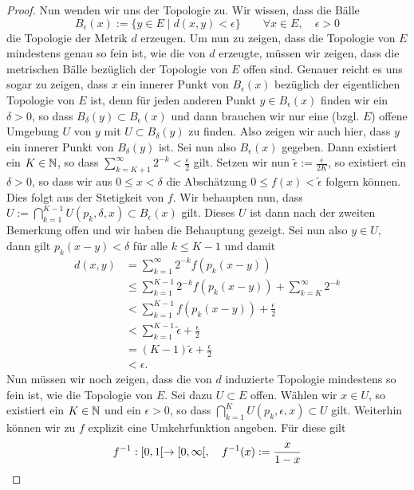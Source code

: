 \begin{proof}
  Nun wenden wir uns der Topologie zu. Wir wissen, dass die Bälle
  \[
  B_\epsilon(x) := \{ y \in E \mid d(x,y) < \epsilon \} \qquad \forall
  x \in E, \quad \epsilon > 0
  \]
  die Topologie der Metrik $d$ erzeugen. Um nun zu zeigen, dass die
  Topologie von $E$ mindestens genau so fein ist, wie die von $d$
  erzeugte, müssen wir zeigen, dass die metrischen Bälle bezüglich der
  Topologie von $E$ offen sind. Genauer reicht es uns sogar
  zu zeigen, dass $x$ ein innerer Punkt von $B_\epsilon(x)$ bezüglich
  der eigentlichen Topologie von $E$ ist, denn
  für jeden anderen Punkt $y \in B_\epsilon(x)$ finden wir ein
  $\delta >0$, so dass $B_\delta(y) \subset B_\epsilon(x)$ und dann
  brauchen wir nur eine (bzgl. $E$) offene Umgebung $U$ von $y$ mit $U
  \subset B_\delta(y)$ zu finden. Also zeigen wir auch hier, dass $y$
  ein innerer Punkt von $B_\delta(y)$ ist. Sei nun also
  $B_\epsilon(x)$ gegeben. Dann existiert ein $K \in \mathbb{N}$, so dass
  $\sum_{k=K+1}^\infty 2^{-k} < \frac{\epsilon}{2}$ gilt. Setzen wir
  nun $\tilde \epsilon := \frac{\epsilon}{2K}$, so  existiert ein
  $\delta > 0$, so dass wir aus $0 \leq x < \delta$ die Abschätzung $0
  \leq f(x) < \tilde \epsilon$ folgern können. Dies folgt aus der
  Stetigkeit von $f$. Wir behaupten nun, dass
  $U := \bigcap_{k=1}^{K-1} U(p_k, \delta, x) \subset B_\epsilon(x)$
  gilt. Dieses $U$ ist dann nach der zweiten Bemerkung offen und wir
  haben die Behauptung gezeigt. Sei nun also $y \in U$, dann gilt
  $p_k(x-y) < \delta$ für alle $k \leq K-1$ und damit
  \begin{align*}
    d(x,y) & = \sum_{k=1}^\infty 2^{-k} f(p_k(x-y)) \\
    & \leq \sum_{k=1}^{K-1}2^{-k} f(p_k(x-y)) + \sum_{k=K}^\infty 2^{-k} \\
    & < \sum_{k=1}^{K-1} f(p_k(x-y)) + \frac{\epsilon}{2} \\
    & < \sum_{k=1}^{K-1} \tilde \epsilon + \frac{\epsilon}{2} \\
    & = (K-1) \tilde \epsilon + \frac{\epsilon}{2}\\
    & < \epsilon.
  \end{align*}
  Nun müssen wir noch zeigen, dass die von $d$ induzierte Topologie
  mindestens so fein ist, wie die Topologie von $E$. Sei dazu $U \subset
  E$ offen. Wählen wir $x \in U$, so existiert ein $K \in \mathbb{N}$ und ein
  $\epsilon > 0$, so dass $\bigcap_{k=1}^K U(p_k, \epsilon, x) \subset
  U$ gilt. Weiterhin können wir zu $f$ explizit eine Umkehrfunktion
  angeben. Für diese gilt
  \[
  f^{-1} :[0, 1[\rightarrow [0, \infty[, \quad f^{-1}(x) := \frac{x}{1-x}
\]
\end{proof}
